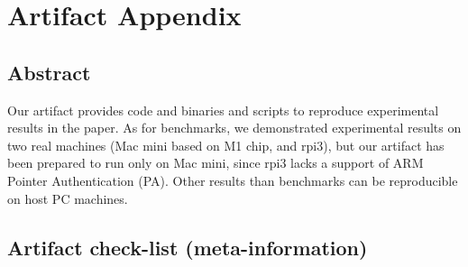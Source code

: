 \documentclass[letterpaper,twocolumn,10pt]{article}
\begin{document}


\appendix
\section{Artifact Appendix}

%

\subsection{Abstract}

Our artifact provides code and binaries and scripts to reproduce experimental results in the paper.
As for benchmarks, we demonstrated experimental results on two real machines (Mac mini based on M1 chip, and rpi3),
but our artifact has been prepared to run only on Mac mini, since rpi3 lacks a support of ARM Pointer Authentication (PA).
Other results than benchmarks can be reproducible on host PC machines.

\subsection{Artifact check-list (meta-information)}
\end{document}
